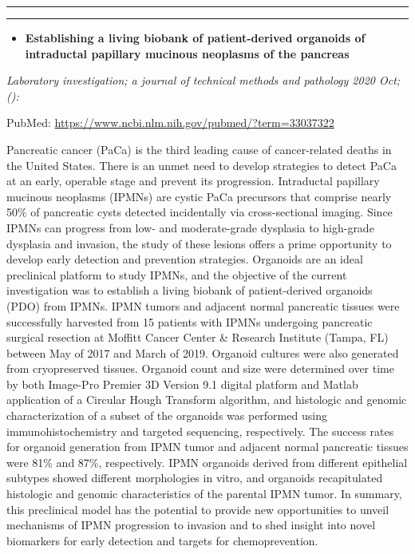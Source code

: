 \documentclass[
]{article}
\providecommand{\tightlist}{%
  \setlength{\itemsep}{0pt}\setlength{\parskip}{0pt}}
\begin{document}
\begin{center}\rule{0.5\linewidth}{0.5pt}\end{center}

\begin{center}\rule{0.5\linewidth}{0.5pt}\end{center}

\begin{itemize}
\tightlist
\item
  \textbf{Establishing a living biobank of patient-derived organoids of
  intraductal papillary mucinous neoplasms of the pancreas}
\end{itemize}

\emph{Laboratory investigation; a journal of technical methods and
pathology 2020 Oct;():}

PubMed: \url{https://www.ncbi.nlm.nih.gov/pubmed/?term=33037322}

Pancreatic cancer (PaCa) is the third leading cause of cancer-related
deaths in the United States. There is an unmet need to develop
strategies to detect PaCa at an early, operable stage and prevent its
progression. Intraductal papillary mucinous neoplasms (IPMNs) are cystic
PaCa precursors that comprise nearly 50\% of pancreatic cysts detected
incidentally via cross-sectional imaging. Since IPMNs can progress from
low- and moderate-grade dysplasia to high-grade dysplasia and invasion,
the study of these lesions offers a prime opportunity to develop early
detection and prevention strategies. Organoids are an ideal preclinical
platform to study IPMNs, and the objective of the current investigation
was to establish a living biobank of patient-derived organoids (PDO)
from IPMNs. IPMN tumors and adjacent normal pancreatic tissues were
successfully harvested from 15 patients with IPMNs undergoing pancreatic
surgical resection at Moffitt Cancer Center \& Research Institute
(Tampa, FL) between May of 2017 and March of 2019. Organoid cultures
were also generated from cryopreserved tissues. Organoid count and size
were determined over time by both Image-Pro Premier 3D Version 9.1
digital platform and Matlab application of a Circular Hough Transform
algorithm, and histologic and genomic characterization of a subset of
the organoids was performed using immunohistochemistry and targeted
sequencing, respectively. The success rates for organoid generation from
IPMN tumor and adjacent normal pancreatic tissues were 81\% and 87\%,
respectively. IPMN organoids derived from different epithelial subtypes
showed different morphologies in vitro, and organoids recapitulated
histologic and genomic characteristics of the parental IPMN tumor. In
summary, this preclinical model has the potential to provide new
opportunities to unveil mechanisms of IPMN progression to invasion and
to shed insight into novel biomarkers for early detection and targets
for chemoprevention.
\end{document}
